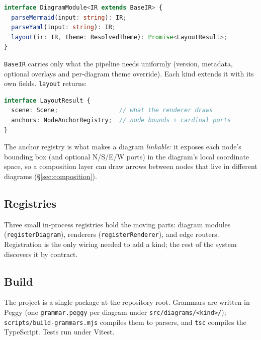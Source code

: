 \begin{lstlisting}[language=ts]
interface DiagramModule<IR extends BaseIR> {
  parseMermaid(input: string): IR;
  parseYaml(input: string): IR;
  layout(ir: IR, theme: ResolvedTheme): Promise<LayoutResult>;
}
\end{lstlisting}

\texttt{BaseIR} carries only what the pipeline needs uniformly (version,
metadata, optional overlays and per-diagram theme override). Each kind extends it
with its own fields. \texttt{layout} returns:

\begin{lstlisting}[language=ts]
interface LayoutResult {
  scene: Scene;                 // what the renderer draws
  anchors: NodeAnchorRegistry;  // node bounds + cardinal ports
}
\end{lstlisting}

The anchor registry is what makes a diagram \emph{linkable}: it exposes each
node's bounding box (and optional N/S/E/W ports) in the diagram's local
coordinate space, so a composition layer can draw arrows between nodes that live
in different diagrams (\S\ref{sec:composition}).

\subsection{Registries}

Three small in-process registries hold the moving parts: diagram modules
(\texttt{registerDiagram}), renderers (\texttt{registerRenderer}), and edge
routers. Registration is the only wiring needed to add a kind; the rest of the
system discovers it by contract.

\subsection{Build}

The project is a single package at the repository root. Grammars are written in
Peggy (one \texttt{grammar.peggy} per diagram under
\texttt{src/diagrams/<kind>/}); \texttt{scripts/build-grammars.mjs} compiles them
to parsers, and \texttt{tsc} compiles the TypeScript. Tests run under Vitest.

